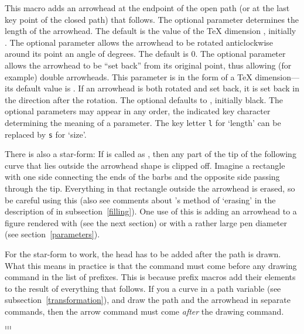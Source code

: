 \documentclass[letterpaper]{article}
\begin{document}
This macro adds an arrowhead at the endpoint of the open path (or at the
last key point of the closed path) that follows. The optional parameter
 determines the length of the arrowhead.  The default is
the value of the \TeX{} dimension , initially \dim{3pt}. The
optional parameter  allows the arrowhead to be rotated
anticlockwise around its point an angle of  degrees. The
default is 0. The optional parameter  allows the arrowhead
to be ``set back'' from its original point, thus allowing (for example)
double arrowheads. This parameter is in the form of a \TeX{}
dimension---its default value is \dim{0pt}. If an arrowhead is both
rotated and set back, it is set back in the direction after the
rotation. The optional  defaults to ,
initially black. The optional parameters may appear in any order, the
indicated key character determining the meaning of a parameter. The key
letter \texttt{l} for `length' can be replaced by \texttt{s} for `size'.

There is also a star-form: If  is called as , then
any part of the tip of the following curve that lies outside the
arrowhead shape is clipped off. Imagine a rectangle with one side
connecting the ends of the barbs and the opposite  side passing through
the tip. Everything in that rectangle outside the arrowhead is erased,
so be careful using this (also see comments about \MP{}'s method of
`erasing' in the description of  in
\cs{}subsection~\ref{filling}). One use of this is adding an arrowhead
to a figure rendered with  (see the next section) or with
a rather large pen diameter (see section~\ref{parameters}).

For the star-form to work, the head has to be added after the path is
drawn. What this means in practice is that the  command must
come before any drawing command in the list of prefixes. This is because
prefix macros add their elements to the result of everything that
follows. If you  a curve in a path variable (see
subsection~\ref{transformation}), and draw the path and the arrowhead in
separate commands, then the arrow command must come \emph{after} the
drawing command.

\begin{cd}
%
    $\ldots$\\
%
    $\ldots$\\
%
    $\ldots$%
%
%
\end{cd}
\end{document}
